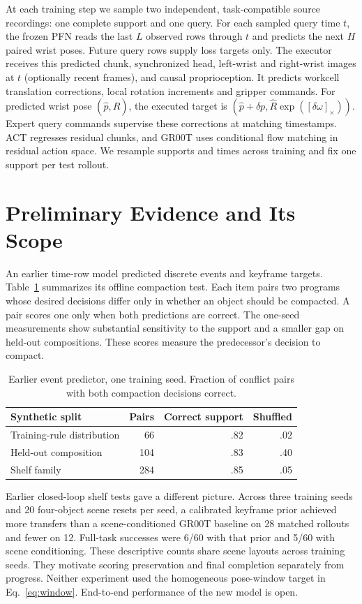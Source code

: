 \documentclass[letterpaper,10pt,conference]{ieeeconf}
\begin{document}
At each training step we sample two independent, task-compatible source recordings: one complete support and one query. For each sampled query time $t$, the frozen PFN reads the last $L$ observed rows through $t$ and predicts the next $H$ paired wrist poses. Future query rows supply loss targets only. The executor receives this predicted chunk, synchronized head, left-wrist and right-wrist images at $t$ (optionally recent frames), and causal proprioception. It predicts workcell translation corrections, local rotation increments and gripper commands. For predicted wrist pose $(\hat p,\hat R)$, the executed target is $(\hat p+\delta p,\hat R\exp([\delta\omega]_\times))$. Expert query commands supervise these corrections at matching timestamps. ACT regresses residual chunks, and GR00T uses conditional flow matching in residual action space. We resample supports and times across training and fix one support per test rollout.


\section{Preliminary Evidence and Its Scope}
\label{sec:pilot}
An earlier time-row model predicted discrete events and keyframe targets. Table~\ref{tab:pilot} summarizes its offline compaction test. Each item pairs two programs whose desired decisions differ only in whether an object should be compacted. A pair scores one only when both predictions are correct. The one-seed measurements show substantial sensitivity to the support and a smaller gap on held-out compositions. These scores measure the predecessor's decision to compact.
\begin{table}[t]
\centering
\caption{Earlier event predictor, one training seed. Fraction of conflict pairs with both compaction decisions correct.}
\label{tab:pilot}
\begin{tabular}{lrrr}
\toprule
Synthetic split & Pairs & Correct support & Shuffled\\
\midrule
Training-rule distribution & 66 & .82 & .02\\
Held-out composition & 104 & .83 & .40\\
Shelf family & 284 & .85 & .05\\
\bottomrule
\end{tabular}
\end{table}

Earlier closed-loop shelf tests gave a different picture. Across three training seeds and 20 four-object scene resets per seed, a calibrated keyframe prior achieved more transfers than a scene-conditioned GR00T baseline on 28 matched rollouts and fewer on 12. Full-task successes were 6/60 with that prior and 5/60 with scene conditioning. These descriptive counts share scene layouts across training seeds. They motivate scoring preservation and final completion separately from progress. Neither experiment used the homogeneous pose-window target in Eq.~\eqref{eq:window}. End-to-end performance of the new model is open.
\end{document}
